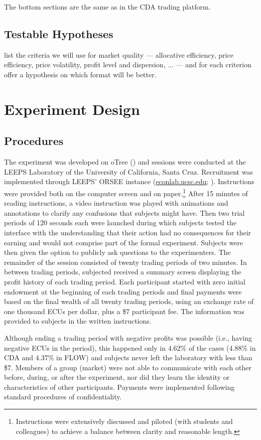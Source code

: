 The bottom sections are the same as in the CDA trading platform. 

\subsection{Testable Hypotheses}
list the criteria we will use for market quality  --- 
allocative efficiency, price efficiency, price volatility, profit level and dispersion, ... ---
and for each criterion offer a hypothesis on which format will be better.




\section{Experiment Design} \label{experiment}


\subsection{Procedures}
The experiment was developed on oTree (\cite{otree}) and sessions were conducted at the LEEPS Laboratory of the University of California, Santa Cruz. Recruitment was implemented through LEEPS' ORSEE instance (\hyperlink{https://econlab.ucsc.edu/public/}{econlab.ucsc.edu}; \cite{subject}). Instructions were provided both on the computer screen and on paper.\footnote{Instructions were extensively discussed and piloted (with students and colleagues) to achieve a balance between clarity and reasonable length.} After 15 minutes of reading instructions, a video instruction was played with animations and annotations to clarify any confusions that subjects might have. Then two trial periods of 120 seconds each were launched during which subjects tested the interface with the understanding that their action had no consequences for their earning and would not comprise part of the formal experiment. Subjects were then given the option to publicly ask questions to the experimenters. The remainder of the session consisted of twenty trading periods of two minutes. In between trading periods, subjected received a summary screen displaying the profit history of each trading period. Each participant started with zero initial endowment at the beginning of each trading periods and final payments were based on the final wealth of all twenty trading periods, using an exchange rate of one thousand ECUs per dollar, plus a \$7 participant fee. The information was provided to subjects in the written instructions.

Although ending a trading period with negative profits was possible (i.e., having negative ECUs in the period), this happened only in 4.62\% of the cases (4.88\% in CDA and 4.37\% in FLOW) and subjects never left the laboratory with less than \$7. Members of a group (market) were not able to communicate with each other before, during, or after the experiment, nor did they learn the identity or characteristics of other participants. Payments were implemented following standard procedures of confidentiality. 

